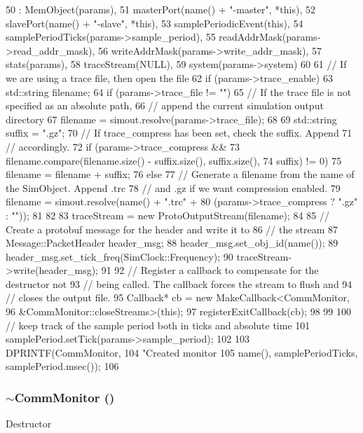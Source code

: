 \begin{DoxyCode}
50     : MemObject(params),
51       masterPort(name() + "-master", *this),
52       slavePort(name() + "-slave", *this),
53       samplePeriodicEvent(this),
54       samplePeriodTicks(params->sample_period),
55       readAddrMask(params->read_addr_mask),
56       writeAddrMask(params->write_addr_mask),
57       stats(params),
58       traceStream(NULL),
59       system(params->system)
60 {
61     // If we are using a trace file, then open the file
62     if (params->trace_enable) {
63         std::string filename;
64         if (params->trace_file != "") {
65             // If the trace file is not specified as an absolute path,
66             // append the current simulation output directory
67             filename = simout.resolve(params->trace_file);
68 
69             std::string suffix = ".gz";
70             // If trace_compress has been set, check the suffix. Append
71             // accordingly.
72             if (params->trace_compress &&
73                 filename.compare(filename.size() - suffix.size(), suffix.size(),
74                                  suffix) != 0)
75                     filename = filename + suffix;
76         } else {
77             // Generate a filename from the name of the SimObject. Append .trc
78             // and .gz if we want compression enabled.
79             filename = simout.resolve(name() + ".trc" +
80                                       (params->trace_compress ? ".gz" : ""));
81         }
82 
83         traceStream = new ProtoOutputStream(filename);
84 
85         // Create a protobuf message for the header and write it to
86         // the stream
87         Message::PacketHeader header_msg;
88         header_msg.set_obj_id(name());
89         header_msg.set_tick_freq(SimClock::Frequency);
90         traceStream->write(header_msg);
91 
92         // Register a callback to compensate for the destructor not
93         // being called. The callback forces the stream to flush and
94         // closes the output file.
95         Callback* cb = new MakeCallback<CommMonitor,
96             &CommMonitor::closeStreams>(this);
97         registerExitCallback(cb);
98     }
99 
100     // keep track of the sample period both in ticks and absolute time
101     samplePeriod.setTick(params->sample_period);
102 
103     DPRINTF(CommMonitor,
104             "Created monitor %
105             name(), samplePeriodTicks, samplePeriod.msec());
106 }
\end{DoxyCode}
\hypertarget{classCommMonitor_a47022a49dc532464956ee511797d53e9}{
\subsubsection[{$\sim$CommMonitor}]{\setlength{\rightskip}{0pt plus 5cm}$\sim${\bf CommMonitor} ()}}
\label{classCommMonitor_a47022a49dc532464956ee511797d53e9}
Destructor 



